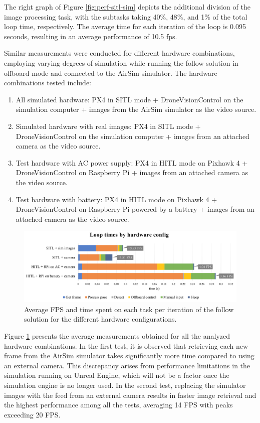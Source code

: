 The right graph of Figure \ref{fig:perf-sitl-sim} depicts the additional division of the image processing task, with the subtasks taking 40\%, 48\%, and 1\% of the total loop time, respectively. The average time for each iteration of the loop is 0.095 seconds, resulting in an average performance of 10.5 \acrfull{fps}.

Similar measurements were conducted for different hardware combinations, employing varying degrees of simulation while running the follow solution in offboard mode and connected to the AirSim simulator. The hardware combinations tested include:
\begin{enumerate}
    \item All simulated hardware: PX4 in SITL mode + DroneVisionControl on the simulation computer + images from the AirSim simulator as the video source.
    \item Simulated hardware with real images: PX4 in SITL mode + DroneVisionControl on the simulation computer + images from an attached camera as the video source.
    \item Test hardware with AC power supply: PX4 in HITL mode on Pixhawk 4 + DroneVisionControl on Raspberry Pi + images from an attached camera as the video source.
    \item Test hardware with battery: PX4 in HITL mode on Pixhawk 4 + DroneVisionControl on Raspberry Pi powered by a battery + images from an attached camera as the video source.
\end{enumerate}


\begin{figure}
  \centering
  \includegraphics[width=\textwidth, keepaspectratio]{img/performance-graph.png}
  \caption{Average FPS and time spent on each task per iteration of the follow solution for the different hardware configurations.}
  \label{fig:perf-analysis}
\end{figure}


Figure \ref{fig:perf-analysis} presents the average measurements obtained for all the analyzed hardware combinations. In the first test, it is observed that retrieving each new frame from the AirSim simulator takes significantly more time compared to using an external camera. This discrepancy arises from performance limitations in the simulation running on Unreal Engine, which will not be a factor once the simulation engine is no longer used. In the second test, replacing the simulator images with the feed from an external camera results in faster image retrieval and the highest performance among all the tests, averaging 14 FPS with peaks exceeding 20 FPS.

